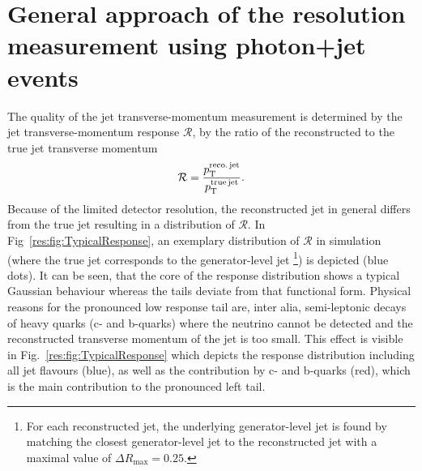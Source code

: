 \FloatBarrier
\chapter{General approach of the resolution measurement using photon+jet events}
\label{res:ch:GeneralApproach}
The quality of the jet transverse-momentum measurement is determined by the jet transverse-momentum response $\mathcal{R}$, \ie by the ratio of the reconstructed to the true jet transverse momentum 
\begin{equation}\label{res:eq:responseFormula}
\mathcal{R} =  \frac{{p}_\mathrm{T}^{\text{reco.\,jet}}}{{p}_\mathrm{T}^{\text{true\,jet}}}.
\end{equation}
Because of the limited detector resolution, the reconstructed jet \pt in general differs from the true jet \pt resulting in a distribution of $\mathcal{R}$.
In Fig~\ref{res:fig:TypicalResponse}, an exemplary distribution of $\mathcal{R}$ in simulation (where the true jet \pt corresponds to the generator-level jet \pt\footnote{For each reconstructed jet, the underlying generator-level jet is found by matching the closest generator-level jet to the reconstructed jet with a maximal value of $\Delta R_{\text{max}}=0.25$.}) is depicted (blue dots).
It can be seen, that the core of the response distribution shows a typical Gaussian behaviour whereas the tails deviate from that functional form.
Physical reasons for the pronounced low response tail are, inter alia, semi-leptonic decays of heavy quarks (c- and b-quarks) where the neutrino cannot be detected and the reconstructed transverse momentum of the jet is too small.
This effect is visible in Fig.~\ref{res:fig:TypicalResponse} which depicts the response distribution including all jet flavours (blue), as well as the contribution by c- and b-quarks (red), which is the main contribution to the pronounced left tail.
